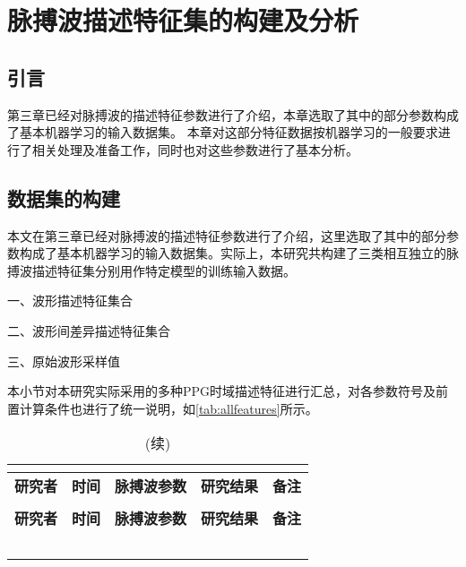 \chapter{脉搏波描述特征集的构建及分析}
\section{引言}
第三章已经对脉搏波的描述特征参数进行了介绍，本章选取了其中的部分参数构成了基本机器学习的输入数据集。
本章对这部分特征数据按机器学习的一般要求进行了相关处理及准备工作，同时也对这些参数进行了基本分析。

\section{数据集的构建}
本文在第三章已经对脉搏波的描述特征参数进行了介绍，这里选取了其中的部分参数构成了基本机器学习的输入数据集。实际上，本研究共构建了三类相互独立的脉搏波描述特征集分别用作特定模型的训练输入数据。

一、波形描述特征集合



二、波形间差异描述特征集合

三、原始波形采样值


本小节对本研究实际采用的多种PPG时域描述特征进行汇总，对各参数符号及前置计算条件也进行了统一说明，如\autoref{tab:allfeatures}所示。
\begin{center}
    \fontsize{10}{4}
    \begin{longtable}{p{3cm}<{\centering}p{1cm}<{\centering}p{2cm}<{\centering}p{6cm}<{\centering}p{1cm}<{\centering}}
        \caption{本研究使用的所有PPG时域指标一览}\\
        \label{tab:allfeatures}\\
        \hline\hline
            \textbf{研究者}&\textbf{时间}&\textbf{脉搏波参数}&\textbf{研究结果}&\textbf{备注}\\
        \hline
        \endfirsthead
        \caption[]{(续)}\\
        \hline
            \textbf{研究者}&\textbf{时间}&\textbf{脉搏波参数}&\textbf{研究结果}&\textbf{备注}\\
        \hline
        \endhead 
        \hline
        \endfoot
        \hline\hline
        \endlastfoot
        &       &       &       &  \\
        &       &       &       &  \\
        &       &       &       &  \\
        &       &       &       &  \\
        &       &       &       &  \\
    \end{longtable}
\end{center}

